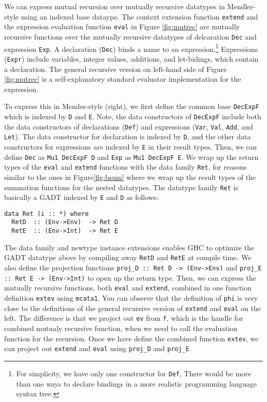 \documentclass[letterpaper,12pt]{article}
\begin{document}
We can express mutual recursion over mutually recursive datatypes
in Mendler-style using an indexed base dataype.
The context extension function \verb|extend| and
the expression evaluation function \verb|eval| in Figure \ref{fig:mutrec}
are mutually recursive functions over the mutually recursive datatypes of
delcaration \verb|Dec| and expression \verb|Exp|.
A declaration (\verb|Dec|) binds a name to an expression.\footnote{For
simplicity, we have only one
constructor for \texttt{Def}, There would be more than one ways to declare bindings in a more realistic
programming language syntax tree.}  Expressions (\verb|Expr|) include variables,
integer values, additions, and let-bidings, which contain a declaration.
The general recursive version on left-hand side of Figure \ref{fig:mutrec}
is a self-explanatory standard evaluator implementation for the expression.

To express this in Mender-style (right), we first define the common base
\verb|DecExpF| which is indexed by \verb|D| and \verb|E|.  Note, the data constructors of
\verb|DecExpF| include both the data constructors of declarations (\verb|Def|) and
expressions (\verb|Var|, \verb|Val|, \verb|Add|, and \verb|Let|).  The data constructor for
declaration is indexed by \verb|D|, and the other data constructors for
expressions are indexed by \verb|E| in their result types.
Then, we can define \verb|Dec| as \verb|Mu1 DecExpF D| and \verb|Exp| as \verb|Mu1 DecExpF E|.
We wrap up the return types of the \verb|eval| and \verb|extend| functions with
the data family \verb|Ret|, for reasons similar to the ones in Figure\;\ref{fig:bsum}
where we wrap up the result types of the summation functions for
the nested datatypes.
The datatype family \verb|Ret| is basically a GADT indexed by \verb|E| and \verb|D| as follows:
\begin{verbatim}
data Ret (i :: *) where
  RetD  :: (Env->Env)  -> Ret D
  RetE  :: (Env->Int)  -> Ret E
\end{verbatim}
The data family and newtype instance extensions enables GHC to optimize the
GADT datatype above by compiling away \verb|RetD| and \verb|RetE| at compile time.
We also define the projection functions \verb|proj_D :: Ret D -> (Env->Env)| and
\verb|proj_E :: Ret E -> (Env->Int)| to open up the return type.
Then, we can express the mutually recursive functions, both \verb|eval| and \verb|extend|,
combined in one function definition \verb|extev| using \verb|mcata1|.
You can observe that the definition of \verb|phi| is very close to the
definitions of the general recursive version of \verb|extend| and \verb|eval| on the left.
The difference is that we project out \verb|ev| from \verb|f|, which is the handle for
combined mutualy recursive function, when we need to call the evaluation
function for the recursion.  Once we have define the combined function \verb|extev|,
we can project out \verb|extend| and \verb|eval| using \verb|proj_D| and \verb|proj_E|.
\end{document}
